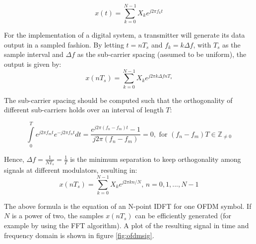 \documentclass[12pt,a4paper,openright]{report}
\begin{document}
\begin{equation}
x(t) = \sum\limits_{k = 0}^{N - 1} {{X_k}{e^{j2\pi {f_k}t}}}
\end{equation}


For the implementation of a digital system, a transmitter will generate its data output in a sampled fashion. By letting $t=nT_s$ and $f_k=k\Delta f$, with $T_s$ as the sample interval and $\Delta f$ as the sub-carrier spacing (assumed to be uniform), the output is given by:
\begin{equation}
x(n{T_s}) = \sum\limits_{k = 0}^{N - 1} {{X_k}{e^{j2\pi k\Delta fn{T_s}}}}
\end{equation}

The sub-carrier spacing should be computed such that the orthogonality of different sub-carriers holds over an interval of length $T$:

\begin{equation}
\int\limits_0^T {{e^{j2\pi {f_m}t}}{e^{ - j2\pi {f_n}t}}} dt = \frac{{{e^{j2\pi ({f_n} - {f_m})t}} - 1}}{{j2\pi ({f_n} - {f_m})}} = 0,{\text{ for }}({f_n} - {f_m})T  \in \mathbb{Z}_{\neq 0}
\end{equation}

Hence, $\Delta f = \frac{1}{NT_s}=\frac{1}{T}$ is the minimum separation to keep orthogonality among signals at different modulators, resulting in:
\begin{equation}
x(n{T_s}) = \sum\limits_{k = 0}^{N - 1} {{X_k}{e^{j2\pi kn/N}}} \text{, }n = 0,1,...,N - 1
\end{equation}


The above formula is the equation of an N-point IDFT for one OFDM symbol. If $N$ is a power of two, the samples $x(nT_s)$ can be efficiently generated (for example by using the FFT algorithm). A plot of the resulting signal in time and frequency domain is shown in figure \ref{fig:ofdmsig}.
\end{document}

